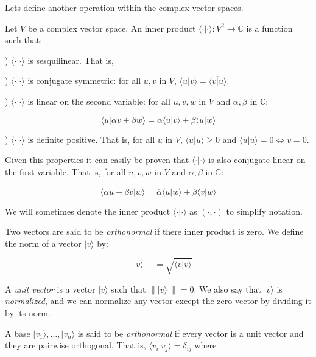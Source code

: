 \documentclass{article}
\begin{document}
	
	Lets define another operation within the complex vector spaces.
	
	\begin{definition}
		Let $V$ be a complex vector space. An inner product $\langle \cdot | \cdot \rangle: V^2 \rightarrow \mathds{C}$ is a function such that:
		
		) $\langle \cdot | \cdot \rangle$ is sesquilinear. That is,
		
		) $\langle \cdot | \cdot \rangle$ is conjugate symmetric: for all $u,v$ in $V$, $\langle u | v \rangle = \overline{\langle v | u \rangle}$.
		
		) $\langle \cdot | \cdot \rangle$ is linear on the second variable: for all $u,v,w$ in $V$ and $\alpha, \beta$ in $\mathds{C}$:
		
		$$ \langle u  | \alpha v + \beta w \rangle = \alpha \langle u | v \rangle + \beta \langle u | w \rangle $$
		
		) $\langle \cdot | \cdot \rangle$ is definite positive. That is, for all $u$ in $V$, $\langle u | u \rangle \geq 0$ and $\langle u | u \rangle = 0 \Longleftrightarrow v = 0$.
	\end{definition}
	
	Given this properties it can easily be proven that $\langle \cdot | \cdot \rangle$ is also conjugate linear on the first variable. That is, for all $u,v,w$ in $V$ and $\alpha, \beta$ in $\mathds{C}$:
	
	$$ \langle \alpha u + \beta v  | w \rangle = \overline{\alpha} \langle u | w \rangle + \overline{\beta} \langle v | w \rangle $$
	
	We will sometimes denote the inner product $\langle \cdot | \cdot \rangle$ as $( \cdot , \cdot )$ to simplify notation.
	
	Two vectors are said to be \emph{orthonormal} if there inner product is zero. We define the norm of a vector $|v\rangle$ by:
	
	$$\parallel |v\rangle \parallel \ = \sqrt{ \langle v|v\rangle }$$
	
	A \emph{unit vector} is a vector $|v\rangle$ such that $\parallel |v\rangle \  \parallel = 0 $. We also say that $|v\rangle$ is \emph{normalized}, and we can normalize any vector except the zero vector by dividing it by its norm.
	
	A base $|v_1\rangle, \dotsc, |v_n\rangle$ is said to be \emph{orthonormal} if every vector is a unit vector and they are pairwise orthogonal. That is, $\langle v_i|v_j\rangle = \delta_{ij}$ where
	
\end{document}
